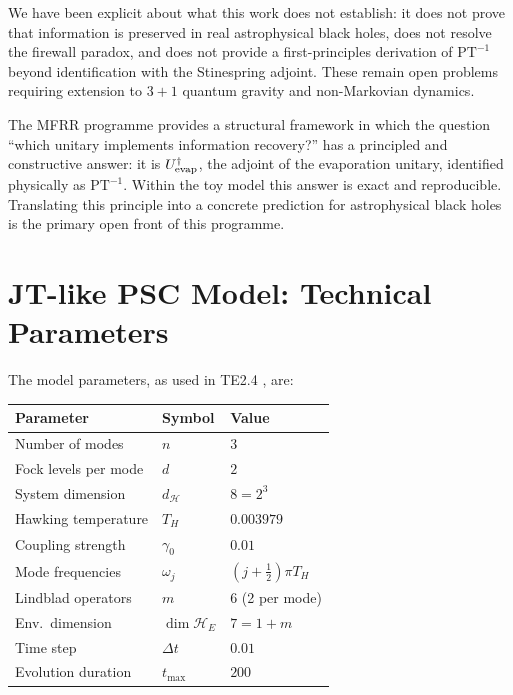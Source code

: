 \documentclass[11pt,twocolumn]{article}
\theoremstyle{remark}
\begin{document}
We have been explicit about what this work does not establish: it does
not prove that information is preserved in real astrophysical black holes,
does not resolve the firewall paradox, and does not provide a
first-principles derivation of $\mathrm{PT}^{-1}$ beyond identification
with the Stinespring adjoint. These remain open problems requiring
extension to $3{+}1$ quantum gravity and non-Markovian dynamics.

The MFRR programme provides a structural framework in which the question
``which unitary implements information recovery?'' has a principled
and constructive answer: it is $U_{\rm evap}^\dagger$, the adjoint of
the evaporation unitary, identified physically as $\mathrm{PT}^{-1}$.
Within the toy model this answer is exact and reproducible.
Translating this principle into a concrete prediction for astrophysical
black holes is the primary open front of this programme.

\appendix

\section{JT-like PSC Model: Technical Parameters}
\label{app:model}

The model parameters, as used in TE2.4 \cite{SpivackBHUnitarity}, are:

{\small
\begin{center}
\begin{tabular}{lll}
\toprule
Parameter & Symbol & Value \\
\midrule
Number of modes & $n$ & $3$ \\
Fock levels per mode & $d$ & $2$ \\
System dimension & $d_{\mathcal{H}}$ & $8 = 2^3$ \\
Hawking temperature & $T_H$ & $0.003979$ \\
Coupling strength & $\gamma_0$ & $0.01$ \\
Mode frequencies & $\omega_j$ & $(j+\tfrac{1}{2})\pi T_H$ \\
Lindblad operators & $m$ & $6$ (2 per mode) \\
Env.\ dimension & $\dim\mathcal{H}_E$ & $7 = 1 + m$ \\
Time step & $\Delta t$ & $0.01$ \\
Evolution duration & $t_{\max}$ & $200$ \\
\bottomrule
\end{tabular}
\end{center}
}
\end{document}
